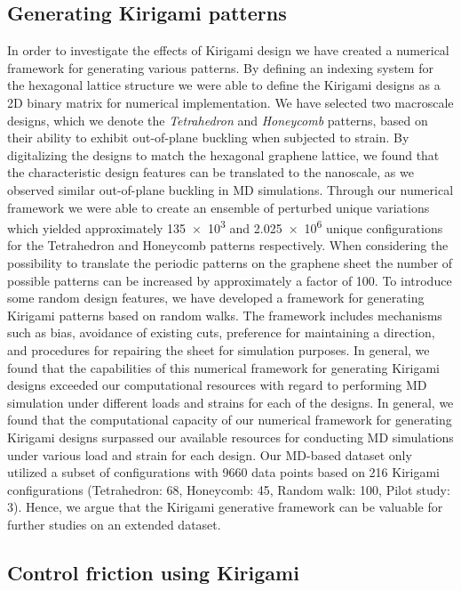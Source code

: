 \subsection{Generating Kirigami patterns}
In order to investigate the effects of Kirigami design we have created a
numerical framework for generating various patterns. By defining an indexing
system for the hexagonal lattice structure we were able to define the Kirigami
designs as a 2D binary matrix for numerical implementation. We have selected two
macroscale designs, which we denote the \textit{Tetrahedron} and
\textit{Honeycomb} patterns, based on their ability to exhibit
out-of-plane buckling when subjected to strain. By digitalizing the designs to
match the hexagonal graphene lattice, we found that the characteristic design
features can be translated to the nanoscale, as we observed similar out-of-plane
buckling in \acrshort{MD} simulations. Through our numerical framework we were
able to create an ensemble of perturbed unique variations which yielded
approximately \num{135e3} and \num{2.025e6} unique configurations for the
Tetrahedron and Honeycomb patterns respectively. When considering the
possibility to translate the periodic patterns on the graphene sheet the number of possible patterns can be increased by approximately a factor of 100. To introduce some random design features, we have developed a framework for generating Kirigami patterns based on random walks. The framework includes mechanisms such as bias, avoidance of existing cuts, preference for maintaining a direction, and procedures for repairing the sheet for simulation purposes. In general, we found that the
capabilities of this numerical framework for generating Kirigami designs exceeded
our computational resources with regard to performing \acrshort{MD} simulation
under different loads and strains for each of the designs. In general, we found that the computational capacity of our numerical framework for generating Kirigami designs surpassed our available resources for conducting  \acrshort{MD} simulations under various load and strain for each design. Our \acrshort{MD}-based dataset only utilized a subset of configurations with 9660 data points based on 216 Kirigami configurations (Tetrahedron: 68, Honeycomb:
45, Random walk: 100, Pilot study: 3). Hence, we argue that the Kirigami generative framework can be valuable for further studies on an extended dataset.


\subsection{Control friction using Kirigami}

